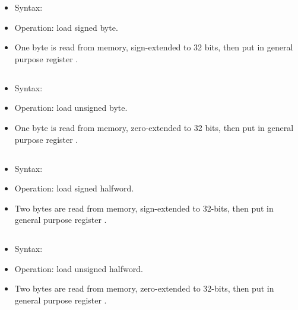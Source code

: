 \begin{itemize}
\item Syntax: 
\item Operation: load signed byte.
\item One byte is read from memory, sign-extended to 32 bits, then put in
      general purpose register .
\end{itemize}

\subsection{}

\begin{itemize}
\item Syntax: 
\item Operation: load unsigned byte.
\item One byte is read from memory, zero-extended to 32 bits, then put in
      general purpose register .
\end{itemize}

\subsection{}

\begin{itemize}
\item Syntax: 
\item Operation: load signed halfword.
\item Two bytes are read from memory, sign-extended to 32-bits, then put in
      general purpose register .
\end{itemize}

\subsection{}

\begin{itemize}
\item Syntax: 
\item Operation: load unsigned halfword.
\item Two bytes are read from memory, zero-extended to 32-bits, then put in
      general purpose register .
\end{itemize}

\subsection{}

